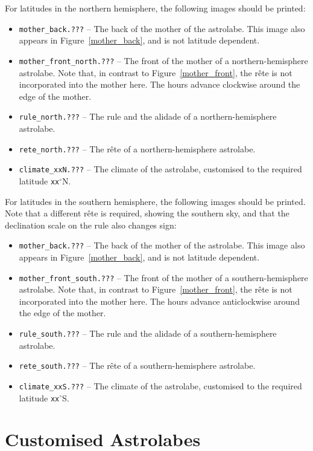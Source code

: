 \documentclass[a4paper,onecolumn,10pt]{article}
\begin{document}
For latitudes in the northern hemisphere, the following images should be
printed:
\begin{itemize}
\item {\tt mother\_back.???} -- The back of the mother of the astrolabe. This image also appears in Figure~\ref{mother_back}, and is not latitude dependent.
\item {\tt mother\_front\_north.???} -- The front of the mother of a northern-hemi\-sp\-here astrolabe. Note that, in contrast to Figure~\ref{mother_front}, the r\^ete is not incorporated into the mother here. The hours advance clockwise around the edge of the mother.
\item {\tt rule\_north.???} -- The rule and the alidade of a northern-hemisphere astrolabe.
\item {\tt rete\_north.???} -- The r\^ete of a northern-hemisphere astrolabe.
\item{\tt climate\_xxN.???} -- The climate of the astrolabe, customised to the required latitude {\tt xx}$^\circ$N.
\end{itemize}

For latitudes in the southern hemisphere, the following images should be
printed. Note that a different r\^ete is required, showing the southern sky,
and that the declination scale on the rule also changes sign:
\begin{itemize}
\item {\tt mother\_back.???} -- The back of the mother of the astrolabe. This image also appears in Figure~\ref{mother_back}, and is not latitude dependent.
\item {\tt mother\_front\_south.???} -- The front of the mother of a southern-hemi\-sp\-here astrolabe. Note that, in contrast to Figure~\ref{mother_front}, the r\^ete is not incorporated into the mother here. The hours advance anticlockwise around the edge of the mother.
\item {\tt rule\_south.???} -- The rule and the alidade of a southern-hemisphere astrolabe.
\item {\tt rete\_south.???} -- The r\^ete of a southern-hemisphere astrolabe.
\item{\tt climate\_xxS.???} -- The climate of the astrolabe, customised to the required latitude {\tt xx}$^\circ$S.
\end{itemize}

\section*{Customised Astrolabes}
\end{document}
